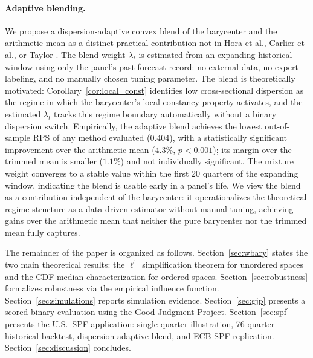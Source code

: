 \paragraph{Adaptive blending.}  We propose a dispersion-adaptive convex blend of the barycenter and the arithmetic mean as a distinct practical contribution not in Hora et al., Carlier et al., or Taylor \cite{taylor26}.  The blend weight $\lambda_t$ is estimated from an expanding historical window using only the panel's past forecast record: no external data, no expert labeling, and no manually chosen tuning parameter.  The blend is theoretically motivated: Corollary~\ref{cor:local_const} identifies low cross-sectional dispersion as the regime in which the barycenter's local-constancy property activates, and the estimated $\lambda_t$ tracks this regime boundary automatically without a binary dispersion switch.  Empirically, the adaptive blend achieves the lowest out-of-sample RPS of any method evaluated ($0.404$), with a statistically significant improvement over the arithmetic mean ($4.3\%$, $p < 0.001$); its margin over the trimmed mean is smaller ($1.1\%$) and not individually significant.  The mixture weight converges to a stable value within the first 20 quarters of the expanding window, indicating the blend is usable early in a panel's life.  We view the blend as a contribution independent of the barycenter: it operationalizes the theoretical regime structure as a data-driven estimator without manual tuning, achieving gains over the arithmetic mean that neither the pure barycenter nor the trimmed mean fully captures.

The remainder of the paper is organized as follows.  Section~\ref{sec:wbary} states the two main theoretical results: the $\ell^1$ simplification theorem for unordered spaces and the CDF-median characterization for ordered spaces.  Section~\ref{sec:robustness} formalizes robustness via the empirical influence function.  Section~\ref{sec:simulations} reports simulation evidence.  Section~\ref{sec:gjp} presents a scored binary evaluation using the Good Judgment Project.  Section~\ref{sec:spf} presents the U.S.\ SPF application: single-quarter illustration, 76-quarter historical backtest, dispersion-adaptive blend, and ECB SPF replication.  Section~\ref{sec:discussion} concludes.


